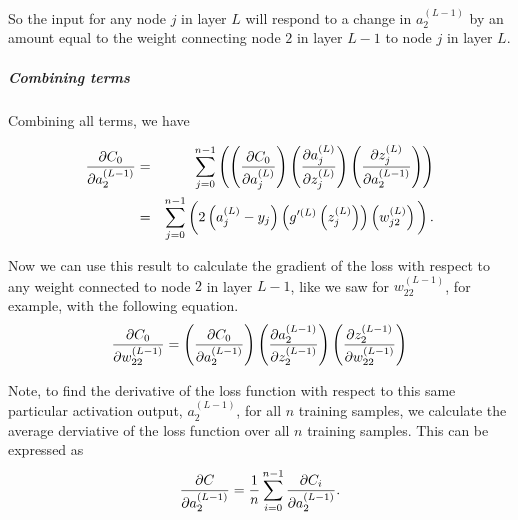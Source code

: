 \documentclass{article}
\begin{document}
So the input for any node $j$ in layer $L$ will respond to a change in $%
a_{2}^{\left( L-1\right) }$ by an amount equal to the weight connecting node 
$2$ in layer $L-1$ to node $j$ in layer $L$.\vspace{1pt}

\subparagraph{Combining terms}

Combining all terms, we have

\begin{eqnarray*}
\frac{\partial C_{0}}{\partial a_{2}^{(L-1)}} &=&\sum_{j=0}^{n-1}\left(
\left( \frac{\partial C_{0}}{\partial a_{j}^{(L)}}\right) \left( \frac{%
\partial a_{j}^{(L)}}{\partial z_{j}^{(L)}}\right) \left( \frac{\partial
z_{j}^{(L)}}{\partial a_{2}^{(L-1)}}\right) \right) \\
&=&\sum_{j=0}^{n-1}\left( 2\left( a_{j}^{\left( L\right) }-y_{j}\right)
\left( g^{\prime \left( L\right) }\left( z_{j}^{\left( L\right) }\right)
\right) \left( w_{j2}^{(L)}\right) \rule[-0.1in]{0in}{0.3in}\right) \text{.}
\end{eqnarray*}

Now we can use this result to calculate the gradient of the loss with
respect to any weight connected \newline
to node $2$ in layer $L-1$, like we saw for $w_{22}^{(L-1)}$, for example,
with the following equation. 
\[
\frac{\partial C_{0}}{\partial w_{22}^{(L-1)}}=\left( \frac{\partial C_{0}}{%
\partial a_{2}^{(L-1)}}\right) \left( \frac{\partial a_{2}^{(L-1)}}{\partial
z_{2}^{(L-1)}}\right) \left( \frac{\partial z_{2}^{(L-1)}}{\partial
w_{22}^{(L-1)}}\right) 
\]

\vspace{1pt}Note, to find the derivative of the loss function with respect
to this same particular activation output, $a_{2}^{(L-1)}$, for all $n$
training samples, we calculate the average derviative of the loss function
over all $n$ training samples. This can be expressed as%
\[
\frac{\partial C}{\partial a_{2}^{(L-1)}}=\frac{1}{n}\sum_{i=0}^{n-1}\frac{%
\partial C_{i}}{\partial a_{2}^{(L-1)}}\text{.} 
\]
\end{document}
